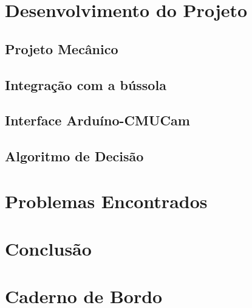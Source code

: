 \documentclass[oneside]{normas-utf-tex} %
\begin{document}
\chapter{Desenvolvimento do Projeto}

\section{Projeto Mecânico}

\section{Integração com a bússola}

\section{Interface Arduíno-CMUCam}

\section{Algoritmo de Decisão}

\chapter{Problemas Encontrados}

\chapter{Conclusão}



\apendice

\chapter{Caderno de Bordo}


\end{document}
